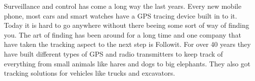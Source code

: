

Surveillance and control has come a long way the last years. Every new mobile phone, most cars and smart watches have a GPS tracing device built in to it. Today it is hard to go anywhere without there beeing some sort of way of finding you. The art of finding has been around for a long time and one company that have taken the tracking aspect to the next step is Followit. For over 40 years they have built different types of GPS and radio transmitters to keep track of everything from small animals like hares and dogs to big elephants. They also got tracking solutions for vehicles like trucks and excavators. 


\thispagestyle{empty}